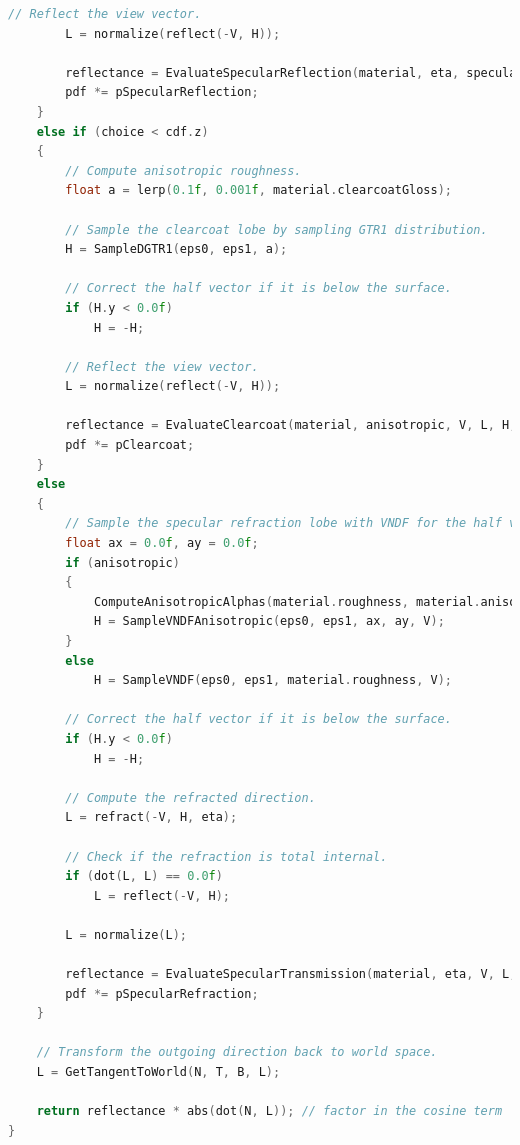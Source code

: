 \documentclass[12pt,a4paper]{report}
\numberwithin{equation}{section} %
\begin{document}
\begin{appendices}
\begin{lstlisting}[caption={Evaluarea și eșantionarea BSDF-ului Disney},label={lst:bsdf},language=C++,escapechar=\$]
		// Reflect the view vector.
		L = normalize(reflect(-V, H));

		reflectance = EvaluateSpecularReflection(material, eta, specularColor, V, L, H, anisotropic, ax, ay, pdf);
		pdf *= pSpecularReflection;
	}
	else if (choice < cdf.z)
	{
		// Compute anisotropic roughness.
		float a = lerp(0.1f, 0.001f, material.clearcoatGloss);

		// Sample the clearcoat lobe by sampling GTR1 distribution.
		H = SampleDGTR1(eps0, eps1, a);

		// Correct the half vector if it is below the surface.
		if (H.y < 0.0f)
			H = -H;

		// Reflect the view vector.
		L = normalize(reflect(-V, H));

		reflectance = EvaluateClearcoat(material, anisotropic, V, L, H, pdf);
		pdf *= pClearcoat;
	}
	else
	{
		// Sample the specular refraction lobe with VNDF for the half vector.
		float ax = 0.0f, ay = 0.0f;
		if (anisotropic)
		{
			ComputeAnisotropicAlphas(material.roughness, material.anisotropic, ax, ay);
			H = SampleVNDFAnisotropic(eps0, eps1, ax, ay, V);
		}
		else
			H = SampleVNDF(eps0, eps1, material.roughness, V);

		// Correct the half vector if it is below the surface.
		if (H.y < 0.0f)
			H = -H;

		// Compute the refracted direction.
		L = refract(-V, H, eta);
		
		// Check if the refraction is total internal.
		if (dot(L, L) == 0.0f)
			L = reflect(-V, H);
		
		L = normalize(L);

		reflectance = EvaluateSpecularTransmission(material, eta, V, L, H, anisotropic, ax, ay, pdf);
		pdf *= pSpecularRefraction;
	}

	// Transform the outgoing direction back to world space.
	L = GetTangentToWorld(N, T, B, L);

	return reflectance * abs(dot(N, L)); // factor in the cosine term
}
\end{lstlisting}
\end{appendices}
\end{document}
